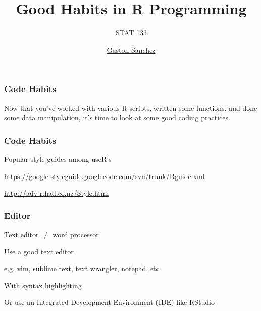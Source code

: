 \documentclass[12pt]{beamer}\usepackage[]{graphicx}\usepackage[]{color}
\title{Good Habits in R Programming}
\subtitle{STAT 133}
\author{\href{http://www.gastonsanchez.com}{Gaston Sanchez}}
\institute{\href{https://github.com/ucb-stat133/stat133-fall-2016}{\tt \scriptsize \color{foreground} github.com/ucb-stat133/stat133-fall-2016}}
\date{}
\begin{document}
{
  \frame{
    \titlepage
  } 
}


\begin{frame}
\begin{center}
\Huge{}
\end{center}
\end{frame}


\begin{frame}
\frametitle{Code Habits}

Now that you've worked with various R scripts, written some functions, and done some data manipulation, it's time to look at some good coding practices.

\end{frame}


\begin{frame}
\frametitle{Code Habits}

Popular style guides among useR's
\bbi
  \item \url{https://google-styleguide.googlecode.com/svn/trunk/Rguide.xml}
  \item \url{http://adv-r.had.co.nz/Style.html}
\ei

\end{frame}


\begin{frame}[fragile]
\frametitle{}
\begin{center}
\end{center}
\end{frame}


\begin{frame}[fragile]
\frametitle{}
\begin{center}
\end{center}
\end{frame}


\begin{frame}
\frametitle{Editor}

\bbi
 \item Text editor $\neq$ word processor
 \item Use a good text editor
 \item e.g. vim, sublime text, text wrangler, notepad, etc
 \item With syntax highlighting
 \item Or use an Integrated Development Environment (IDE) like RStudio
\ei
\eb

\end{frame}
\end{document}
